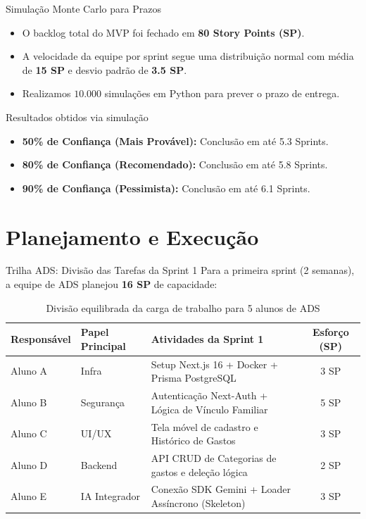 \documentclass[10pt]{beamer}
\begin{document}
\begin{frame}{Simulação Monte Carlo para Prazos}
    \begin{itemize}
        \item O backlog total do MVP foi fechado em \textbf{80 Story Points (SP)}.
        \item A velocidade da equipe por sprint segue uma distribuição normal com média de \textbf{15 SP} e desvio padrão de \textbf{3.5 SP}.
        \item Realizamos $10.000$ simulações em Python para prever o prazo de entrega.
    \end{itemize}
    \begin{block}{Resultados obtidos via simulação}
        \begin{itemize}
            \item \textbf{50\% de Confiança (Mais Provável):} Conclusão em até 5.3 Sprints.
            \item \textbf{80\% de Confiança (Recomendado):} Conclusão em até 5.8 Sprints.
            \item \textbf{90\% de Confiança (Pessimista):} Conclusão em até 6.1 Sprints.
        \end{itemize}
    \end{block}
\end{frame}

\section{Planejamento e Execução}
\begin{frame}{Trilha ADS: Divisão das Tarefas da Sprint 1}
    Para a primeira sprint (2 semanas), a equipe de ADS planejou \textbf{16 SP} de capacidade:
    \begin{table}[]
        \tiny
        \centering
        \begin{tabular}{lllc}
            \toprule
            \textbf{Responsável} & \textbf{Papel Principal} & \textbf{Atividades da Sprint 1} & \textbf{Esforço (SP)} \\
            \midrule
            Aluno A & Infra & Setup Next.js 16 + Docker + Prisma PostgreSQL & 3 SP \\
            Aluno B & Segurança & Autenticação Next-Auth + Lógica de Vínculo Familiar & 5 SP \\
            Aluno C & UI/UX & Tela móvel de cadastro e Histórico de Gastos & 3 SP \\
            Aluno D & Backend & API CRUD de Categorias de gastos e deleção lógica & 2 SP \\
            Aluno E & IA Integrador & Conexão SDK Gemini + Loader Assíncrono (Skeleton) & 3 SP \\
            \bottomrule
        \end{tabular}
        \caption{Divisão equilibrada da carga de trabalho para 5 alunos de ADS}
    \end{table}
\end{frame}
\end{document}
